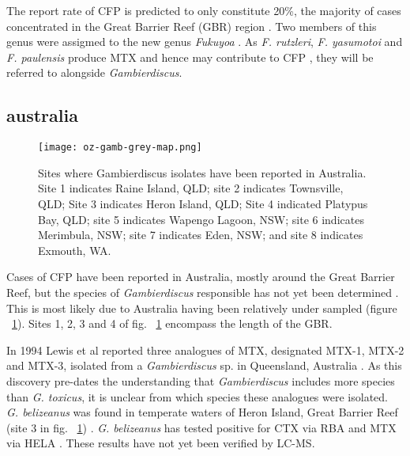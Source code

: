 \documentclass[12pt]{article}
\begin{document}
The report rate of CFP is predicted to only constitute 20\%, the majority of cases concentrated in the Great Barrier Reef (GBR) region \cite{lewis2006ciguatera}.
Two members of this genus were assigmed to the new genus \emph{Fukuyoa} \cite{gomez2015fukuyoa}. As \emph{F. rutzleri}, \emph{F. yasumotoi} and \emph{F. paulensis} produce MTX and hence may contribute to CFP \cite{kohli2014feeding}, they will be referred to alongside \emph{Gambierdiscus}.

\subsection{australia}
\FloatBarrier
\begin{figure} 
\texttt{[image: oz-gamb-grey-map.png]} 
\caption{Sites where Gambierdiscus isolates have been reported in Australia. Site 1 indicates Raine Island, QLD; site 2 indicates Townsville, QLD; Site 3 indicates Heron Island, QLD; Site 4 indicated Platypus Bay, QLD; site 5 indicates Wapengo Lagoon, NSW; site 6 indicates Merimbula, NSW; site 7 indicates Eden, NSW; and site 8 indicates Exmouth, WA.​} 
\label{fig:OzSites}
\end{figure}
\FloatBarrier 
Cases of CFP have been reported in Australia, mostly around the Great Barrier Reef, but the species of \emph{Gambierdiscus} responsible has not yet been determined \cite{lewis2006ciguatera}. This is most likely due to Australia having been relatively under sampled (figure ~\ref{fig:OzSites}). Sites 1, 2, 3 and 4 of fig. ~\ref{fig:OzSites} encompass the length of the GBR.

In 1994 Lewis et al reported three analogues of MTX, designated MTX-1, MTX-2 and MTX-3, isolated from a \emph{Gambierdiscus} sp. in Queensland, Australia \cite{holmes1994purification}. As this discovery pre-dates the understanding that \emph{Gambierdiscus} includes more species than \emph{G. toxicus}, it is unclear from which species these analogues were isolated.  \\


\emph{G. belizeanus} was found in temperate waters of Heron Island, Great Barrier Reef (site 3 in fig. ~\ref{fig:OzSites}) \cite{murray2014molecular}. \emph{G. belizeanus} has tested positive for CTX via RBA \cite{chinain2010growth} and MTX via HELA \cite{holland2013differences}. These results have not yet been verified by LC-MS.\\
\end{document}
